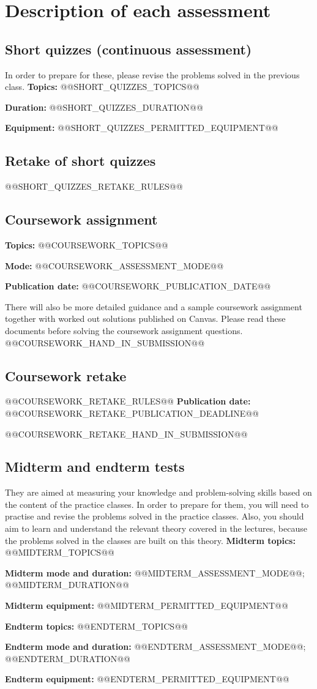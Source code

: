 \documentclass[11pt,a4paper]{article}
\newcommand{\field}[2]{\textbf{#1:} #2\par}
\begin{document}
\section*{Description of each assessment}
\subsection*{Short quizzes (continuous assessment)}
In order to prepare for these, please revise the problems solved in the previous class.
\field{Topics}{@@SHORT_QUIZZES_TOPICS@@}
\field{Duration}{@@SHORT_QUIZZES_DURATION@@}
\field{Equipment}{@@SHORT_QUIZZES_PERMITTED_EQUIPMENT@@}
\subsection*{Retake of short quizzes}
@@SHORT_QUIZZES_RETAKE_RULES@@

\subsection*{Coursework assignment}
\field{Topics}{@@COURSEWORK_TOPICS@@}
\field{Mode}{@@COURSEWORK_ASSESSMENT_MODE@@}
\field{Publication date}{@@COURSEWORK_PUBLICATION_DATE@@}
There will also be more detailed guidance and a sample coursework assignment
together with worked out solutions published on Canvas. Please read these
documents before solving the coursework assignment questions.
@@COURSEWORK_HAND_IN_SUBMISSION@@

\subsection*{Coursework retake}
@@COURSEWORK_RETAKE_RULES@@
\field{Publication date}{@@COURSEWORK_RETAKE_PUBLICATION_DEADLINE@@}
@@COURSEWORK_RETAKE_HAND_IN_SUBMISSION@@

\subsection*{Midterm and endterm tests}
They are aimed at measuring your knowledge and problem-solving skills based on the
content of the practice classes. In order to prepare for them, you will need to
practise and revise the problems solved in the practice classes. Also, you should
aim to learn and understand the relevant theory covered in the lectures, because
the problems solved in the classes are built on this theory.
\field{Midterm topics}{@@MIDTERM_TOPICS@@}
\field{Midterm mode and duration}{@@MIDTERM_ASSESSMENT_MODE@@; @@MIDTERM_DURATION@@}
\field{Midterm equipment}{@@MIDTERM_PERMITTED_EQUIPMENT@@}
\field{Endterm topics}{@@ENDTERM_TOPICS@@}
\field{Endterm mode and duration}{@@ENDTERM_ASSESSMENT_MODE@@; @@ENDTERM_DURATION@@}
\field{Endterm equipment}{@@ENDTERM_PERMITTED_EQUIPMENT@@}
\end{document}
